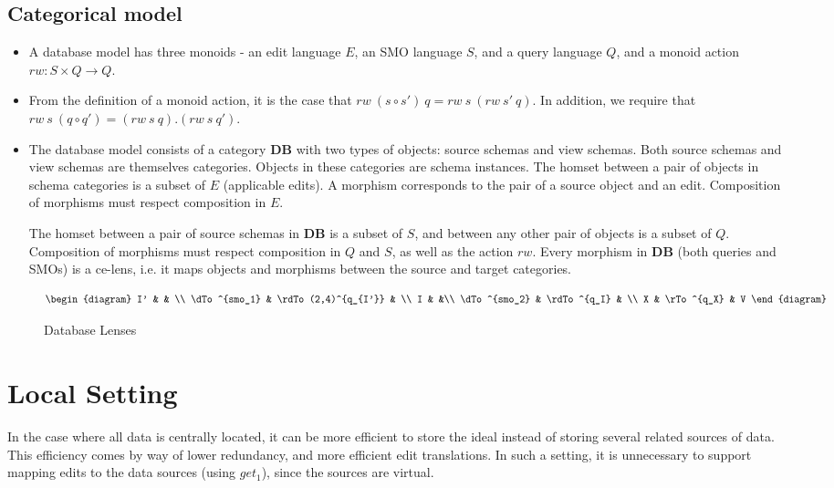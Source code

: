 \documentclass[a4paper,10pt]{article}
\newcommand{\db}{\ensuremath{\mathbf{DB}}}
\begin{document}
\subsection{Categorical model}
\begin{itemize}
 \item A database model has three monoids - an edit language $E$, an SMO language $S$, and a query language $Q$, and a monoid action $rw : S \times Q \to Q$.
 
 \item From the definition of a monoid action, it is the case that $rw~(s \circ s')~q = rw~s~(rw~s'~q)$. In addition, we require that $rw~s~(q \circ q') = (rw~s~q). (rw~s~q')$.
 
\item The database model consists of a category $\db$ with two types of objects: source schemas and view schemas. Both source schemas and view schemas are themselves categories. Objects in these categories are schema instances. The homset between a pair of objects in schema categories is a subset of $E$ (applicable edits). A morphism corresponds to the pair of a source object and an edit. Composition of morphisms must respect composition in $E$. 
 
 The homset between a pair of source schemas in $\db$ is a subset of $S$, and between any other pair of objects is a subset of $Q$. Composition of morphisms must respect composition in $Q$ and $S$, as well as the action $rw$. Every morphism in $\db$ (both queries and SMOs) is a ce-lens, i.e. it maps objects and morphisms between the source and target categories.
 
\end{itemize}


\begin{figure}[ht]
\begin{displaymath}
\begin{diagram}
I' & & \\
\dTo^{smo_1} & \rdTo(2,4)^{q_{I'}} & \\
I & &\\
\dTo^{smo_2} & \rdTo^{q_I} & \\
X & \rTo^{q_X} & V
\end{diagram}
\end{displaymath}
\caption{Database Lenses}
\label{fig:database-lens}
\end{figure}


\section{Local Setting}
  In the case where all data is centrally located, it can be more efficient to store the ideal instead of storing several related sources of data. This efficiency comes by way of lower redundancy, and more efficient edit translations. In such a setting, it is unnecessary to support mapping edits to the data sources (using $get_1$), since the sources are virtual. 
\end{document}
